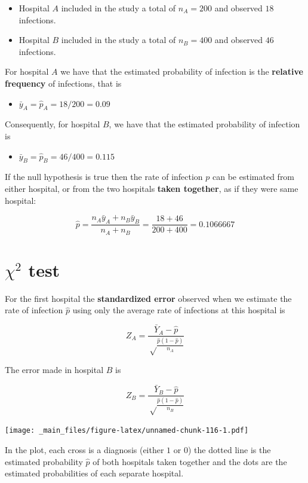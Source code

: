 \documentclass[
]{book}
\providecommand{\tightlist}{%
  \setlength{\itemsep}{0pt}\setlength{\parskip}{0pt}}
\begin{document}
\begin{itemize}
\item
  Hospital \(A\) included in the study a total of \(n_A=200\) and observed \(18\) infections.
\item
  Hospital \(B\) included in the study a total of \(n_B=400\) and observed \(46\) infections.
\end{itemize}

For hospital \(A\) we have that the estimated probability of infection is the \textbf{relative frequency} of infections, that is

\begin{itemize}
\tightlist
\item
  \(\bar{y}_A=\hat{p}_A=18/200=0.09\)
\end{itemize}

Consequently, for hospital \(B\), we have that the estimated probability of infection is

\begin{itemize}
\tightlist
\item
  \(\bar{y}_B=\hat{p}_B=46/400=0.115\)
\end{itemize}

If the null hypothesis is true then the rate of infection \(p\) can be estimated from either hospital, or from the two hospitals \textbf{taken together}, as if they were same hospital:

\[\hat{p}=\frac{n_A\bar{y}_A+n_B\bar{y}_B}{n_A+n_B}=\frac{18+46}{200+400}=0.1066667\]

\hypertarget{chi2-test}{%
\section{\texorpdfstring{\(\chi^2\) test}{\textbackslash chi\^{}2 test}}\label{chi2-test}}

For the first hospital the \textbf{standardized error} observed when we estimate the rate of infection \(\hat{p}\) using only the average rate of infections at this hospital is

\[Z_A= \frac{\bar{Y}_A-\hat{p}}{\sqrt\frac{\hat{p}(1-\hat{p})}{n_A}}\]

The error made in hospital \(B\) is

\[Z_B= \frac{\bar{Y}_B-\hat{p}}{\sqrt\frac{\hat{p}(1-\hat{p})}{n_B}}\]

\texttt{[image: \_main\_files/figure-latex/unnamed-chunk-116-1.pdf]}

In the plot, each cross is a diagnosis (either \(1\) or \(0\)) the dotted line is the estimated probability \(\hat{p}\) of both hospitals taken together and the dots are the estimated probabilities of each separate hospital.
\end{document}
